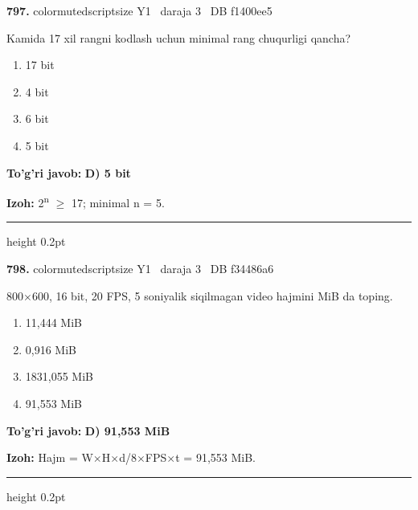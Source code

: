 \documentclass[10pt,a4paper,oneside]{article}
\begin{document}
\noindent\textbf{\color{ink}797.}  {color{muted}scriptsize Y1 \textbullet\ daraja 3 \textbullet\ DB f1400ee5}
\par
Kamida 17 xil rangni kodlash uchun minimal rang chuqurligi qancha?
\begin{enumerate}[label=\Alph*),leftmargin=9mm]
\item 17 bit
\item 4 bit
\item 6 bit
\item 5 bit
\end{enumerate}
\begin{tcolorbox}[enhanced,breakable,colback=teal!4,colframe=teal!50!black,boxrule=0.5pt,arc=1.1mm,left=3mm,right=3mm,top=1.7mm,bottom=1.7mm,before skip=2mm,after skip=2mm]
\textbf{\color{teal}To'g'ri javob:} \textbf{D) 5 bit}
\par\smallskip
\textbf{Izoh:} 2\textsuperscript{n} \ensuremath{\geq} 17; minimal n = 5.
\end{tcolorbox}
\vspace{2mm}\hrule height 0.2pt \vspace{3mm}

\noindent\textbf{\color{ink}798.}  {color{muted}scriptsize Y1 \textbullet\ daraja 3 \textbullet\ DB f34486a6}
\par
800\ensuremath{\times}600, 16 bit, 20 FPS, 5 soniyalik siqilmagan video hajmini MiB da toping.
\begin{enumerate}[label=\Alph*),leftmargin=9mm]
\item 11,444 MiB
\item 0,916 MiB
\item 1831,055 MiB
\item 91,553 MiB
\end{enumerate}
\begin{tcolorbox}[enhanced,breakable,colback=teal!4,colframe=teal!50!black,boxrule=0.5pt,arc=1.1mm,left=3mm,right=3mm,top=1.7mm,bottom=1.7mm,before skip=2mm,after skip=2mm]
\textbf{\color{teal}To'g'ri javob:} \textbf{D) 91,553 MiB}
\par\smallskip
\textbf{Izoh:} Hajm = W\ensuremath{\times}H\ensuremath{\times}d/8\ensuremath{\times}FPS\ensuremath{\times}t = 91,553 MiB.
\end{tcolorbox}
\vspace{2mm}\hrule height 0.2pt \vspace{3mm}
\end{document}
